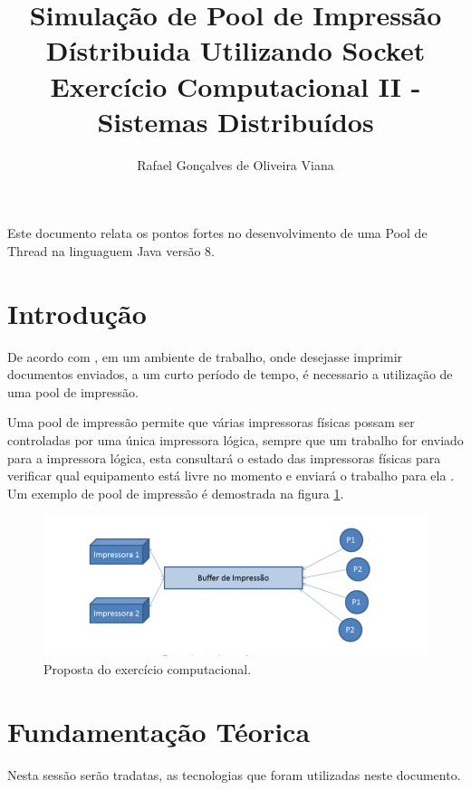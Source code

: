 \documentclass[12pt]{article}
\title{ Simulação de Pool de Impressão Dístribuida Utilizando Socket \\ Exercício Computacional II - Sistemas Distribuídos}
\author{Rafael Gonçalves de Oliveira Viana\inst{1}  }
\begin{document}
 

\maketitle

     
\begin{resumo} 	
  Este  documento relata os pontos fortes no desenvolvimento de uma Pool de Thread na linguaguem Java versão 8.
\end{resumo}

\section{Introdução}
 De acordo com \cite{entf}, em um ambiente de trabalho, onde desejasse imprimir documentos enviados, a um curto período de tempo, é necessario a utilização de uma pool de impressão.
 
 Uma pool de impressão permite que várias impressoras físicas possam ser controladas por uma única impressora lógica,  sempre que um trabalho for enviado para a impressora lógica, esta consultará o estado das impressoras físicas para verificar qual equipamento está livre no momento e enviará o trabalho para ela .
Um exemplo de pool de impressão é demostrada na figura \ref{fig:screenshot001}.
\begin{figure}[H]
 	\centering
 	\includegraphics[width=0.7\linewidth]{imagens/screenshot001}
 	\caption{Proposta do exercício computacional.}
 	\label{fig:screenshot001}
 \end{figure}
 
\section{Fundamentação Téorica} 
	Nesta sessão serão tradatas, as tecnologias que foram utilizadas neste documento.
 
\end{document}
